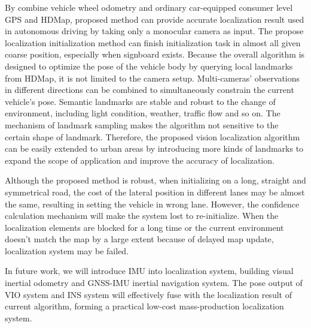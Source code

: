 \documentclass[letterpaper, 10 pt, conference]{ieeeconf}
\begin{document}
By combine vehicle wheel odometry and ordinary car-equipped consumer level GPS and HDMap, proposed method can provide accurate localization result used in autonomous driving by taking only a monocular camera as input. The propose localization initialization method can finish initialization task in almost all given coarse position, especially when signboard exists. Because the overall algorithm is designed to optimize the pose of the vehicle body by querying local landmarks from HDMap, it is not limited to the camera setup. Multi-cameras' observations in different directions can be combined to simultaneously constrain the current vehicle's pose. Semantic landmarks are stable and robust to the change of environment, including light condition, weather, traffic flow and so on. The mechanism of landmark sampling makes the algorithm not sensitive to the certain shape of landmark. Therefore, the proposed vision localization algorithm can be easily extended to urban areas by introducing more kinds of landmarks to expand the scope of application and improve the accuracy of localization.

Although the proposed method is robust, when initializing on a long, straight and symmetrical road, the cost of the lateral position in different lanes may be almost the same, resulting in setting the vehicle in wrong lane. However, the confidence calculation mechanism will make the system lost to re-initialize. When the localization elements are blocked for a long time or the current environment doesn't match the map by a large extent because of delayed map update, localization system may be failed.

In future work, we will introduce IMU into localization system, building visual inertial odometry and GNSS-IMU inertial navigation system. The pose output of VIO system and INS system will effectively fuse with the localization result of current algorithm, forming a practical low-cost mass-production localization system. 


\addtolength{\textheight}{-12cm}   %
\end{document}
